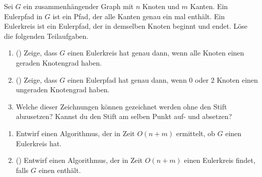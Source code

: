 \documentclass{uebung_cs}
\begin{document}
\begin{aufgabe}
	Sei $G$ ein zusammenhängender Graph mit $n$ Knoten und $m$ Kanten.
	Ein Eulerpfad in $G$ ist ein Pfad, der alle Kanten genau ein mal enthält.
	Ein Eulerkreis ist ein Eulerpfad, der in demselben Knoten beginnt und endet.
	Löse die folgenden Teilaufgaben.
	\begin{enumerate}
		\item (\hard) Zeige, dass $G$ einen Eulerkreis hat genau dann, wenn alle Knoten einen geraden Knotengrad haben.
		\item (\hard) Zeige, dass $G$ einen Eulerpfad hat genau dann, wenn 0 oder 2 Knoten einen ungeraden Knotengrad haben.
		\item Welche dieser Zeichnungen können gezeichnet werden ohne den Stift abzusetzen?
		Kannst du den Stift am selben Punkt auf- und absetzen?
	\end{enumerate}
	\begin{center}
		\hspace{1.5cm}
		\hspace{1.5cm}
	\end{center}
	\begin{enumerate}[resume]
		\item Entwirf einen Algorithmus, der in Zeit $O(n+m)$ ermittelt, ob $G$ einen Eulerkreis hat.
		\item (\hard) Entwirf einen Algorithmus, der in Zeit $O(n+m)$ einen Eulerkreis findet, falls $G$ einen enthält.
	\end{enumerate}	
\end{aufgabe}
\end{document}
